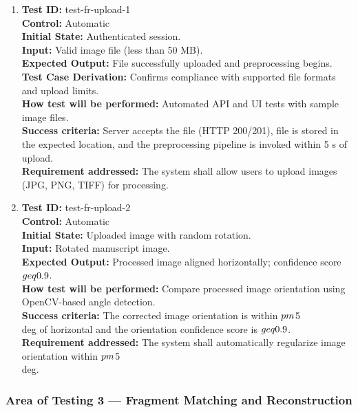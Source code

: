 \documentclass[12pt, titlepage]{article}
\begin{document}
\begin{enumerate}
\item
\textbf{Test ID:} test-fr-upload-1\\
\textbf{Control:} Automatic\\
\textbf{Initial State:} Authenticated session.\\
\textbf{Input:} Valid image file (less than 50 MB).\\
\textbf{Expected Output:} File successfully uploaded and preprocessing begins.\\
\textbf{Test Case Derivation:} Confirms compliance with supported file formats and upload limits.\\
\textbf{How test will be performed:} Automated API and UI tests with sample image files.\\
\textbf{Success criteria:} Server accepts the file (HTTP 200/201), file is stored in the expected location, and the preprocessing pipeline is invoked within 5 s of upload.\\
\textbf{Requirement addressed:} The system shall allow users to upload images (JPG, PNG, TIFF) for processing.\\

\item
\textbf{Test ID:} test-fr-upload-2\\
\textbf{Control:} Automatic\\
\textbf{Initial State:} Uploaded image with random rotation.\\
\textbf{Input:} Rotated manuscript image.\\
\textbf{Expected Output:} Processed image aligned horizontally; confidence score $\\geq 0.9$.\\
\textbf{How test will be performed:} Compare processed image orientation using OpenCV-based angle detection.\\
\textbf{Success criteria:} The corrected image orientation is within $\\pm$5\\deg of horizontal and the orientation confidence score is $\\geq 0.9$.\\
\textbf{Requirement addressed:} The system shall automatically regularize image orientation within $\\pm$5\\deg.\\
\end{enumerate}

\subsubsection{Area of Testing 3 — Fragment Matching and Reconstruction}
\end{document}
